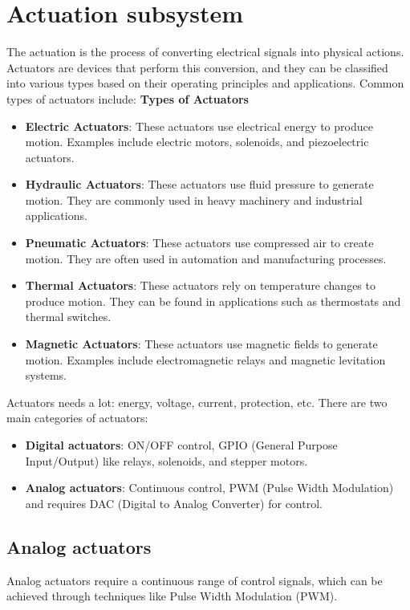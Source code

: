 \section{Actuation subsystem}
The actuation is the process of converting electrical signals into physical
actions. Actuators are devices that perform this conversion, and they can be
classified into various types based on their operating principles and
applications. Common types of actuators include: \newline \textbf{Types of
    Actuators}
\begin{itemize}
    \item \textbf{Electric Actuators}: These actuators use electrical energy to
          produce motion. Examples include electric motors, solenoids, and
          piezoelectric actuators.
    \item \textbf{Hydraulic Actuators}: These actuators use fluid pressure to
          generate motion. They are commonly used in heavy machinery and
          industrial applications.
    \item \textbf{Pneumatic Actuators}: These actuators use compressed air to
          create motion. They are often used in automation and manufacturing
          processes.
    \item \textbf{Thermal Actuators}: These actuators rely on temperature
          changes to produce motion. They can be found in applications such as
          thermostats and thermal switches.
    \item \textbf{Magnetic Actuators}: These actuators use magnetic fields to
          generate motion. Examples include electromagnetic relays and magnetic
          levitation systems.
\end{itemize}
Actuators needs a lot: energy, voltage, current, protection, etc. There are two
main categories of actuators:
\begin{itemize}
    \item \textbf{Digital actuators}: ON/OFF control, GPIO (General Purpose
          Input/Output) like relays, solenoids, and stepper motors.
    \item \textbf{Analog actuators}: Continuous control, PWM (Pulse Width
          Modulation) and requires DAC (Digital to Analog Converter) for
          control.
\end{itemize}
\subsection{Analog actuators}
Analog actuators require a continuous range of control signals, which can be
achieved through techniques like Pulse Width Modulation (PWM).

